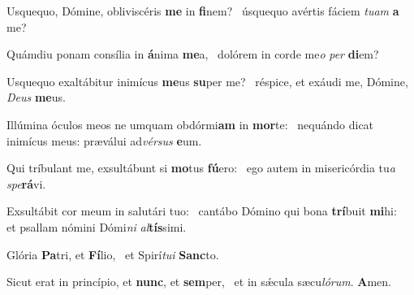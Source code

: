 \item Usquequo, Dómine, obliviscéris \textbf{me} in \textbf{fi}nem?~\psstar{} úsquequo avértis fáciem \textit{tuam} \textbf{a} me?
\item Quámdiu ponam consília in \textbf{á}nima \textbf{me}a,~\psstar{} dolórem in corde me\textit{o} \textit{per} \textbf{di}em?
\item Usquequo exaltábitur inimícus \textbf{me}us \textbf{su}per me?~\psstar{} réspice, et exáudi me, Dómine, \textit{Deus} \textbf{me}us.
\item Illúmina óculos meos ne umquam obdórmi\textbf{am} in \textbf{mor}te:~\psstar{} nequándo dicat inimícus meus: præválui ad\textit{vérsus} \textbf{e}um.
\item Qui tríbulant me, exsultábunt si \textbf{mo}tus \textbf{fú}ero:~\psstar{} ego autem in misericórdia tu\textit{a} \textit{spe}\textbf{rá}vi.
\item Exsultábit cor meum in salutári tuo:~\pscross{} cantábo Dómino qui bona \textbf{trí}buit \textbf{mi}hi:~\psstar{} et psallam nómini Dómi\textit{ni} \textit{al}\textbf{tís}simi.
\item Glória \textbf{Pa}tri, et \textbf{Fí}lio,~\psstar{} et Spirí\textit{tui} \textbf{Sanc}to.
\item Sicut erat in princípio, et \textbf{nunc}, et \textbf{sem}per,~\psstar{} et in sǽcula sæcu\textit{lórum}. \textbf{A}men.
